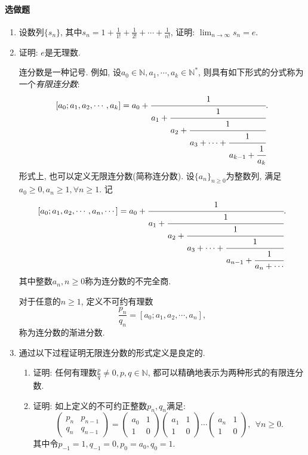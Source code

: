 \documentclass[UTF8,11pt, a4paper, oneside, fontset=none]{ctexbook}
\begin{document}
\paragraph{选做题}
\begin{enumerate}


\item 设数列$\{ s_n \}$, 其中$s_n = 1 + \frac{1}{1!} + \frac{1}{2!} + \cdots + \frac{1}{n!}$, 证明: $\lim_{n \to \infty} s_n =e$.

\item 证明: $e$是无理数.

\begin{tcolorbox}[colback=white, breakable]


连分数是一种记号. 例如, 设$a_0 \in \mathbb N, a_1, \cdots, a_k \in \mathbb N^*$, 则具有如下形式的分式称为一个{\it 有限连分数}:
\[
[a_0; a_1, a_2, \cdots, a_k] = a_0 + \cfrac{1}{ a_1 + \cfrac{1}{ a_2 + \cfrac{1}{ a_3 + \cdots + \cfrac{1}{a_{k-1} + \cfrac{1}{a_k}}}}}.
\]
形式上, 也可以定义无限连分数(简称连分数). 设$\{ a_n \}_{n \geq 0}$为整数列, 满足$a_0 \geq 0, a_n \geq 1, \forall n \geq 1$. 记
\[
[a_0; a_1, a_2, \cdots, a_n, \cdots] = a_0 + \cfrac{1}{ a_1 + \cfrac{1}{ a_2 + \cfrac{1}{ a_3 + \cdots + \cfrac{1}{a_{n-1} + \cfrac{1}{a_n + \cdots}}}}}.
\]
其中整数$a_n, n \geq 0$称为连分数的不完全商. 


对于任意的$n \geq 1$, 定义不可约有理数
\[
\frac{p_n}{q_n} = [a_0; a_1, a_2, \cdots, a_n],
\]
称为连分数的渐进分数. 

\end{tcolorbox}

\item 通过以下过程证明无限连分数的形式定义是良定的.

\begin{enumerate}
\item 证明: 任何有理数$\frac{p}{q} \neq 0, p, q \in \mathbb N$, 都可以精确地表示为两种形式的有限连分数.

\item 证明: 如上定义的不可约正整数$p_n, q_n$满足:
\[
\left(
\begin{array}{cc}
p_n & p_{n-1}\\
q_n & q_{n-1}
\end{array}
\right)=
\left(
\begin{array}{cc}
a_0 & 1\\
1 & 0
\end{array}
\right)
\left(
\begin{array}{cc}
a_1 & 1\\
1 & 0
\end{array}
\right)\cdots
\left(
\begin{array}{cc}
a_n & 1\\
1 & 0
\end{array}
\right), \ \ \forall n \geq 0.
\]
其中令$p_{-1}=1, q_{-1}=0, p_0 = a_0, q_0 =1$.


\end{enumerate}
\end{enumerate}
\end{document}
